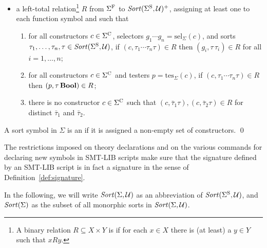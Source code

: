 \begin{definition}
\begin{itemize}
\item
a left-total  relation\footnote{%
A binary relation $R \subseteq X \times Y$ is 
if for each $x \in X$ there is (at least) a $y \in Y$ such that $xRy$.
}
$R$ from $\Sigma^\mathrm{F}$ to $\mathit{Sort}(\Sigma^\mathrm{S}, \mathcal{U})^+$,
assigning at least one  to each function symbol and
such that
\begin{enumerate}
%

\item
for all constructors $c \in \Sigma^\mathrm{C}$, 
selectors $g_1 \cdots g_n = \mathrm{sel}_\Sigma(c)$, and
sorts $\tau_1,\ldots,\tau_n,\tau \in \mathit{Sort}(\Sigma^\mathrm{S}, \mathcal{U})$,
if $(c, \tau_1\cdots\tau_n\tau) \in R$
then $(g_i,\tau\,\tau_i) \in R$ for all $i=1,\ldots,n$;

\item
for all constructors $c \in \Sigma^\mathrm{C}$ and 
testers $p = \mathrm{tes}_\Sigma(c)$,
if $(c, \tau_1\cdots\tau_n\tau) \in R$
then $(p,\tau\,\textbf{Bool}) \in R$;

\item
there is no constructor $c \in \Sigma^\mathrm{C}$ such that
$(c, \bar{\tau}_1\tau), (c, \bar{\tau}_2\tau) \in R$ 
for distinct $\bar{\tau}_1$ and $\bar{\tau}_2$.
\end{enumerate}
\end{itemize}

A sort symbol in $\Sigma$ is an 
if it is assigned a non-empty set of constructors.
\qed
\end{definition}

\begin{remark}
The restrictions imposed on theory declarations and on the various commands
for declaring new symbols in SMT-LIB scripts make sure that 
the signature defined by an SMT-LIB script is in fact a signature 
in the sense of Definition~\ref{def:signature}.
\end{remark}

\begin{notation}
In the following, we will write $\mathit{Sort}(\Sigma, \mathcal{U})$ as an abbreviation 
of $\mathit{Sort}(\Sigma^\mathrm{S}, \mathcal{U})$, and $\mathit{Sort}(\Sigma)$ as the subset of all 
monorphic sorts in $\mathit{Sort}(\Sigma, \mathcal{U})$.
\end{notation}

